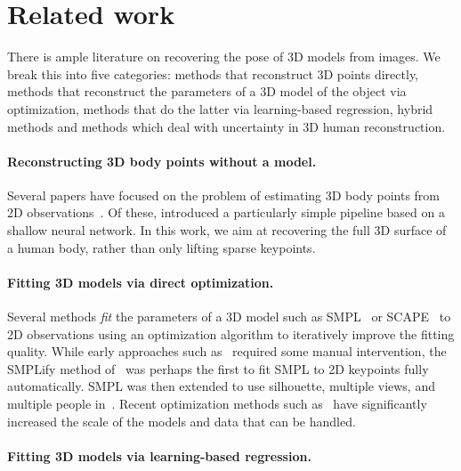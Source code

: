 \section{Related work}\label{s:related}

There is ample literature on recovering the pose of 3D models from images.
We break this into five categories: methods that reconstruct 3D points directly, methods that reconstruct the parameters of a 3D model of the object via optimization, methods that do the latter via learning-based regression, hybrid methods and methods which deal with uncertainty in 3D human reconstruction.

\paragraph{Reconstructing 3D body points without a model.}

Several papers have focused on the problem of estimating 3D body points from 2D observations~\cite{anguelov05scape,mehta17vnect,rogez18lcr-net,sun18integral,kolotouros19convolutional}.
Of these, {}\citet{martinez17a-simple} introduced a particularly simple pipeline based on a shallow neural network.
In this work, we aim at recovering the full 3D surface of a human body, rather than only lifting sparse keypoints.

\paragraph{Fitting 3D models via direct optimization.}

Several methods \emph{fit} the parameters of a 3D model such as SMPL~\cite{loper15smpl} or SCAPE~\cite{anguelov05scape} to 2D observations using an optimization algorithm to iteratively improve the fitting quality.
While early approaches such as~\cite{guan09estimating,sigal08combined} required some manual intervention, the SMPLify method of~\citet{bogo16keep} was perhaps the first to fit SMPL to 2D keypoints fully automatically.
SMPL was then extended to use silhouette, multiple views, and multiple people in~\cite{lassner17unite,huang17towards,zanfir18monocular}.
Recent optimization methods such as~\cite{joo18total,pavlakos19expressive,xiang19monocular} have significantly increased the scale of the models and data that can be handled.

\paragraph{Fitting 3D models via learning-based regression.}

